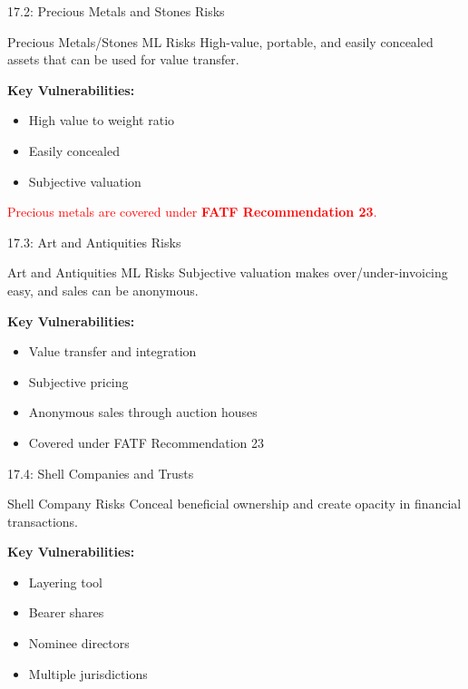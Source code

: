 \documentclass{beamer}
\begin{document}
	\begin{frame}{17.2: Precious Metals and Stones Risks}
		\begin{block}{Precious Metals/Stones ML Risks}
			High-value, portable, and easily concealed assets that can be used for value transfer.
		\end{block}
		\textbf{Key Vulnerabilities:}
		\begin{itemize}
			\item High value to weight ratio
			\item Easily concealed
			\item Subjective valuation
		\end{itemize}
		\textcolor{red}{Precious metals are covered under \textbf{FATF Recommendation 23}.}
	\end{frame}
	
	\begin{frame}{17.3: Art and Antiquities Risks}
		\begin{block}{Art and Antiquities ML Risks}
			Subjective valuation makes over/under-invoicing easy, and sales can be anonymous.
		\end{block}
		\textbf{Key Vulnerabilities:}
		\begin{itemize}
			\item Value transfer and integration
			\item Subjective pricing
			\item Anonymous sales through auction houses
			\item Covered under FATF Recommendation 23
		\end{itemize}
	\end{frame}
	
	\begin{frame}{17.4: Shell Companies and Trusts}
		\begin{block}{Shell Company Risks}
			Conceal beneficial ownership and create opacity in financial transactions.
		\end{block}
		\textbf{Key Vulnerabilities:}
		\begin{itemize}
			\item Layering tool
			\item Bearer shares
			\item Nominee directors
			\item Multiple jurisdictions
		\end{itemize}
	\end{frame}
	
\end{document}
